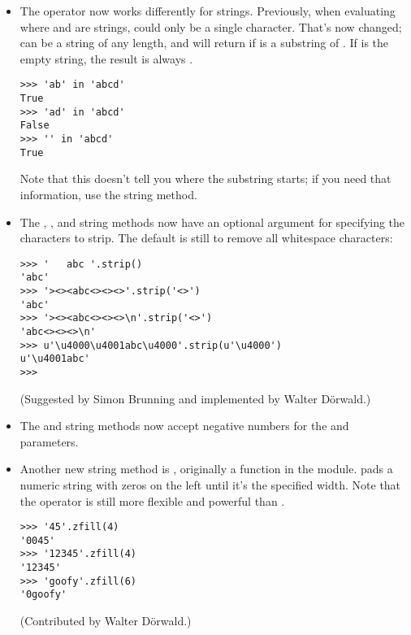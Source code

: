 \documentclass{howto}
\begin{document}
\begin{itemize}

\item The  operator now works differently for strings.
Previously, when evaluating  where 
and  are strings,  could only be a single character.
That's now changed;  can be a string of any length, and
 will return  if  is a
substring of .  If  is the empty string, the result is
always .

\begin{verbatim}
>>> 'ab' in 'abcd'
True
>>> 'ad' in 'abcd'
False
>>> '' in 'abcd'
True
\end{verbatim}

Note that this doesn't tell you where the substring starts; if you
need that information, use the  string method.

\item The , , and 
string methods now have an optional argument for specifying the
characters to strip.  The default is still to remove all whitespace
characters:

\begin{verbatim}
>>> '   abc '.strip()
'abc'
>>> '><><abc<><><>'.strip('<>')
'abc'
>>> '><><abc<><><>\n'.strip('<>')
'abc<><><>\n'
>>> u'\u4000\u4001abc\u4000'.strip(u'\u4000')
u'\u4001abc'
>>>
\end{verbatim}

(Suggested by Simon Brunning and implemented by Walter D\"orwald.)

\item The  and 
string methods now accept negative numbers for the  and 
parameters.

\item Another new string method is , originally a
function in the  module.   pads a
numeric string with zeros on the left until it's the specified width.
Note that the \code{\%} operator is still more flexible and powerful
than .

\begin{verbatim}
>>> '45'.zfill(4)
'0045'
>>> '12345'.zfill(4)
'12345'
>>> 'goofy'.zfill(6)
'0goofy'
\end{verbatim}

(Contributed by Walter D\"orwald.)


\end{itemize}
\end{document}
